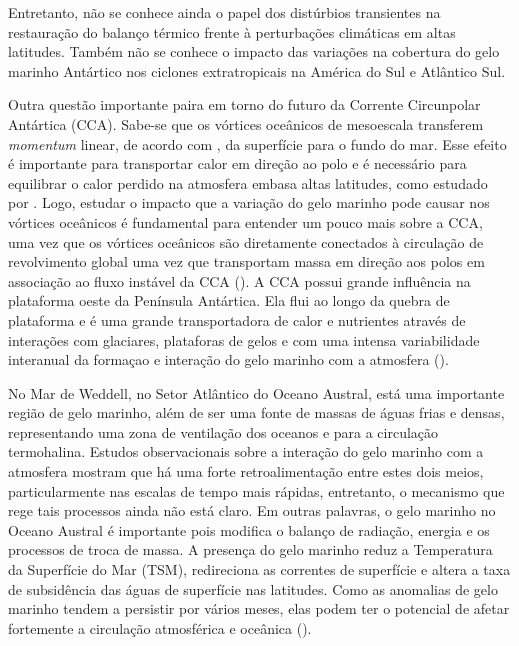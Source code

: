 \documentclass{article}
\begin{document}
Entretanto, não se conhece ainda o papel dos distúrbios transientes na restauração do balanço térmico frente à perturbações
climáticas em altas latitudes. Também não se conhece o impacto das variações na cobertura do gelo marinho Antártico nos ciclones
extratropicais na América do Sul e Atlântico Sul. 

Outra questão importante paira em torno do futuro da Corrente Circunpolar Antártica (CCA). Sabe-se que os vórtices oceânicos
de mesoescala transferem \textit{momentum} linear, de acordo com \textcite{Munk1951}, da superfície para o fundo do mar. Esse
efeito é importante para transportar calor em direção ao polo e é necessário para equilibrar o calor perdido na atmosfera embasa
altas latitudes, como estudado por \textcite{Johnson1989}. Logo, estudar o impacto que a variação do 
gelo marinho pode causar nos vórtices oceânicos é fundamental para entender um pouco mais sobre a CCA, uma vez que os
vórtices oceânicos são diretamente conectados à circulação de revolvimento global uma vez que transportam massa em 
direção aos polos em associação ao fluxo instável da CCA (\cite{Rintoul2018}). A CCA possui grande influência na 
plataforma oeste da Península Antártica. Ela flui ao longo da quebra de plataforma e é uma grande transportadora de 
calor e nutrientes através de interações com glaciares, plataforas de gelos e com uma intensa variabilidade interanual 
da formaçao e interação do gelo marinho com a atmosfera (\cite{Moffat2018}). 

No Mar de Weddell, no Setor Atlântico do Oceano Austral, está uma importante região de gelo marinho, além de ser uma fonte de massas 
de águas  frias e densas, representando uma  zona de ventilação dos oceanos e para a circulação termohalina. Estudos observacionais 
sobre a interação do gelo marinho com a atmosfera mostram que há uma forte retroalimentação entre estes dois meios, particularmente 
nas escalas de tempo mais rápidas, entretanto, o mecanismo que rege tais processos ainda não está claro. Em outras palavras, o gelo 
marinho no Oceano Austral é importante pois modifica o balanço de radiação, energia e os processos de troca de massa. 
A presença do gelo marinho reduz a Temperatura da Superfície do Mar (TSM), redireciona as correntes de superfície e altera a 
taxa de subsidência das águas de superfície nas latitudes. Como as anomalias de gelo marinho tendem a persistir por vários meses,
elas podem ter o potencial de afetar fortemente a circulação atmosférica e oceânica (\cite{Simmonds2003}).
\end{document}
